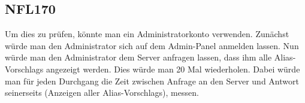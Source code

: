 \subsection*{NFL170}
Um dies zu prüfen, könnte man ein \Gls{Administrator}konto verwenden. Zunächst würde man den \Gls{Administrator} sich auf dem \Gls{Admin-Panel} anmelden lassen. Nun würde man den \Gls{Administrator} dem \Gls{Server} anfragen lassen, dass ihm alle \Glspl{Alias-Vorschlag} angezeigt werden. Dies würde man 20 Mal wiederholen. Dabei würde man für jeden Durchgang die Zeit zwischen Anfrage an den \Gls{Server} und Antwort seinerseits (Anzeigen aller \Glspl{Alias-Vorschlag}), messen.